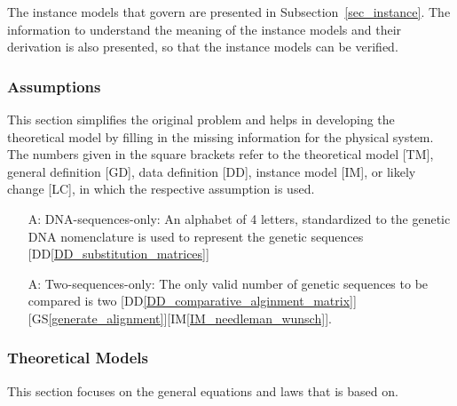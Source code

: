 \documentclass[12pt]{article}
\newcounter{assumpnum} %
\begin{document}
The instance models that govern \progname{} are presented in
Subsection~\ref{sec_instance}.  The information to understand the meaning of the
instance models and their derivation is also presented, so that the instance
models can be verified.


\subsubsection{Assumptions} \label{sec_assumpt}


This section simplifies the original problem and helps in developing the
theoretical model by filling in the missing information for the physical system.
The numbers given in the square brackets refer to the theoretical model [TM],
general definition [GD], data definition [DD], instance model [IM], or likely
change [LC], in which the respective assumption is used.

\begin{itemize}

\item[A\refstepcounter{assumpnum}\theassumpnum \label{dna-sequences-only}:]
DNA-sequences-only: An alphabet of 4 letters, standardized to the genetic DNA nomenclature is used 
to represent the genetic sequences [DD\autoref{DD_substitution_matrices}]
\item[A\refstepcounter{assumpnum}\theassumpnum \label{two-sequences-only}:]
Two-sequences-only: The only valid number of genetic sequences to be compared is two [DD\autoref{DD_comparative_alginment_matrix}][GS\autoref{generate_alignment}][IM\autoref{IM_needleman_wunsch}].

\end{itemize}

\subsubsection{Theoretical Models}\label{sec_theoretical}



This section focuses on the general equations and laws that \progname{} is based
on.  

~\newline
\end{document}
